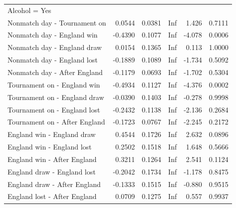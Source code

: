 \documentclass[12pt, letterpaper]{article}
\begin{document}
\begin{table}[ht]
{\begin{tabular}{lrrrrl}
   \hline
\multicolumn{6}{l}{Alcohol = Yes}\\
Nonmatch day - Tournament on & 0.0544 & 0.0381 & Inf & 1.426 & 0.7111 \\ 
  Nonmatch day - England win & -0.4390 & 0.1077 & Inf & -4.078 & 0.0006 \\ 
  Nonmatch day - England draw & 0.0154 & 0.1365 & Inf & 0.113 & 1.0000 \\ 
  Nonmatch day - England lost & -0.1889 & 0.1089 & Inf & -1.734 & 0.5092 \\ 
  Nonmatch day - After England & -0.1179 & 0.0693 & Inf & -1.702 & 0.5304 \\ 
  Tournament on - England win & -0.4934 & 0.1127 & Inf & -4.376 & 0.0002 \\ 
  Tournament on - England draw & -0.0390 & 0.1403 & Inf & -0.278 & 0.9998 \\ 
  Tournament on - England lost & -0.2432 & 0.1138 & Inf & -2.136 & 0.2684 \\ 
  Tournament on - After England & -0.1723 & 0.0767 & Inf & -2.245 & 0.2172 \\ 
  England win - England draw & 0.4544 & 0.1726 & Inf & 2.632 & 0.0896 \\ 
  England win - England lost & 0.2502 & 0.1518 & Inf & 1.648 & 0.5666 \\ 
  England win - After England & 0.3211 & 0.1264 & Inf & 2.541 & 0.1124 \\ 
  England draw - England lost & -0.2042 & 0.1734 & Inf & -1.178 & 0.8475 \\ 
  England draw - After England & -0.1333 & 0.1515 & Inf & -0.880 & 0.9515 \\ 
  England lost - After England & 0.0709 & 0.1275 & Inf & 0.557 & 0.9937 \\ 
   \hline
%
%
\end{tabular}}
\end{table}

\newpage
\end{document}
